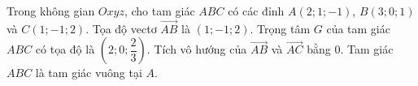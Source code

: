 \begin{ex}
Trong không gian $Oxyz$, cho tam giác $ABC$ có các đỉnh $A(2;1;-1)$, $B(3;0;1)$ và $C(1;-1;2)$.
\choiceTF
{\True Tọa độ vectơ $\overrightarrow{AB}$ là $(1;-1;2)$.}
{\True Trọng tâm $G$ của tam giác $ABC$ có tọa độ là $\left(2;0;\dfrac23\right)$.}
{Tích vô hướng của $\overrightarrow{AB}$ và $\overrightarrow{AC}$ bằng $0$.}
{Tam giác $ABC$ là tam giác vuông tại $A$.}
\end{ex}
